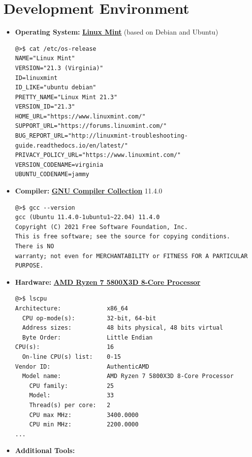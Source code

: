 \documentclass[11pt,a4paper]{report}
\theoremstyle{definitionstyle}
\begin{document}
\section{Development Environment}
\begin{itemize}
	\item \textbf{Operating System:} \textbf{\underline{Linux Mint}} (based on Debian and Ubuntu)
\begin{lstlisting}[numbers=none]
@>$ cat /etc/os-release
NAME="Linux Mint"
VERSION="21.3 (Virginia)"
ID=linuxmint
ID_LIKE="ubuntu debian"
PRETTY_NAME="Linux Mint 21.3"
VERSION_ID="21.3"
HOME_URL="https://www.linuxmint.com/"
SUPPORT_URL="https://forums.linuxmint.com/"
BUG_REPORT_URL="http://linuxmint-troubleshooting-guide.readthedocs.io/en/latest/"
PRIVACY_POLICY_URL="https://www.linuxmint.com/"
VERSION_CODENAME=virginia
UBUNTU_CODENAME=jammy
\end{lstlisting}

	
	\item \textbf{Compiler:} \textbf{\underline{GNU Compiler Collection}} 11.4.0
\begin{lstlisting}[numbers=none]
@>$	gcc --version
gcc (Ubuntu 11.4.0-1ubuntu1~22.04) 11.4.0
Copyright (C) 2021 Free Software Foundation, Inc.
This is free software; see the source for copying conditions.  There is NO
warranty; not even for MERCHANTABILITY or FITNESS FOR A PARTICULAR PURPOSE.
\end{lstlisting}
	\item \textbf{Hardware:} \textbf{\underline{AMD Ryzen 7 5800X3D 8-Core Processor}}
\begin{lstlisting}[numbers=none]
@>$ lscpu
Architecture:             x86_64
  CPU op-mode(s):         32-bit, 64-bit
  Address sizes:          48 bits physical, 48 bits virtual
  Byte Order:             Little Endian
CPU(s):                   16
  On-line CPU(s) list:    0-15
Vendor ID:                AuthenticAMD
  Model name:             AMD Ryzen 7 5800X3D 8-Core Processor
    CPU family:           25
    Model:                33
    Thread(s) per core:   2
    CPU max MHz:          3400.0000
    CPU min MHz:          2200.0000
...
\end{lstlisting}
	\item \textbf{Additional Tools:} 
	

\end{itemize}
\end{document}
